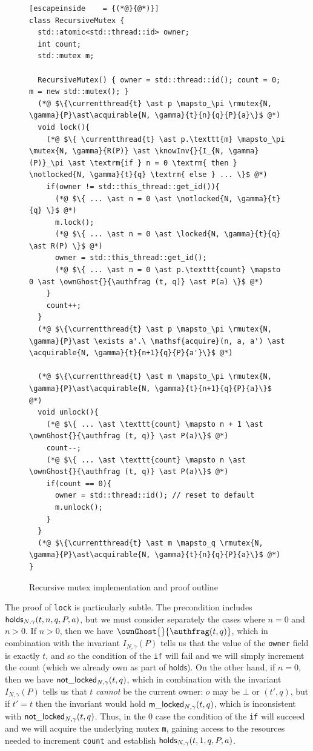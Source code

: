 \begin{figure}[htb]
\begin{lstlisting}[escapeinside    = {(*@}{@*)}]
class RecursiveMutex {
  std::atomic<std::thread::id> owner;
  int count;
  std::mutex m;

  RecursiveMutex() { owner = std::thread::id(); count = 0; m = new std::mutex(); }
  (*@ $\{\currentthread{t} \ast p \mapsto_\pi \rmutex{N, \gamma}{P}\ast\acquirable{N, \gamma}{t}{n}{q}{P}{a}\}$ @*)
  void lock(){
    (*@ $\{ \currentthread{t} \ast p.\texttt{m} \mapsto_\pi \mutex{N, \gamma}{R(P)} \ast \knowInv{}{I_{N, \gamma}(P)}_\pi \ast \textrm{if } n = 0 \textrm{ then } \notlocked{N, \gamma}{t}{q} \textrm{ else } ... \}$ @*)
    if(owner != std::this_thread::get_id()){
      (*@ $\{ ... \ast n = 0 \ast \notlocked{N, \gamma}{t}{q} \}$ @*)
      m.lock();
      (*@ $\{ ... \ast n = 0 \ast \locked{N, \gamma}{t}{q} \ast R(P) \}$ @*)
      owner = std::this_thread::get_id();
      (*@ $\{ ... \ast n = 0 \ast p.\texttt{count} \mapsto 0 \ast \ownGhost{}{\authfrag (t, q)} \ast P(a) \}$ @*)
    }
    count++;
  }
  (*@ $\{\currentthread{t} \ast p \mapsto_\pi \rmutex{N, \gamma}{P}\ast \exists a'.\ \mathsf{acquire}(n, a, a') \ast \acquirable{N, \gamma}{t}{n+1}{q}{P}{a'}\}$ @*)

  (*@ $\{\currentthread{t} \ast m \mapsto_\pi \rmutex{N, \gamma}{P}\ast\acquirable{N, \gamma}{t}{n+1}{q}{P}{a}\}$ @*)
  void unlock(){
    (*@ $\{ ... \ast \texttt{count} \mapsto n + 1 \ast \ownGhost{}{\authfrag (t, q)} \ast P(a)\}$ @*)
    count--;
    (*@ $\{ ... \ast \texttt{count} \mapsto n \ast \ownGhost{}{\authfrag (t, q)} \ast P(a)\}$ @*)
    if(count == 0){
      owner = std::thread::id(); // reset to default
      m.unlock();
    }
  }
  (*@ $\{\currentthread{t} \ast m \mapsto_q \rmutex{N, \gamma}{P}\ast\acquirable{N, \gamma}{t}{n}{q}{P}{a}\}$ @*)
}
\end{lstlisting}
\caption{Recursive mutex implementation and proof outline}
\label{rmutex-simple-proof}
\end{figure}

The proof of \lstinline{lock} is particularly subtle. The precondition includes $\acquirable{N, \gamma}{t}{n}{q}{P}{a}$, but we must consider separately the cases where $n = 0$ and $n > 0$. If $n > 0$, then we have $\ownGhost{}{\authfrag (t, q)}$, which in combination with the invariant $I_{N, \gamma}(P)$ tells us that the value of the \lstinline{owner} field is exactly $t$, and so the condition of the \lstinline{if} will fail and we will simply increment the count (which we already own as part of $\mathsf{holds}$). On the other hand, if $n = 0$, then we have $\notlocked{N, \gamma}{t}{q}$, which in combination with the invariant $I_{N, \gamma}(P)$ tells us that $t$ \emph{cannot} be the current owner: $o$ may be $\bot$ or $(t', q)$, but if $t' = t$ then the invariant would hold $\locked{N, \gamma}{t}{q}$, which is inconsistent with $\notlocked{N, \gamma}{t}{q}$. Thus, in the 0 case the condition of the \lstinline{if} will succeed and we will acquire the underlying mutex \lstinline{m}, gaining access to the resources needed to increment \lstinline{count} and establish $\acquirable{N, \gamma}{t}{1}{q}{P}{a}$.

